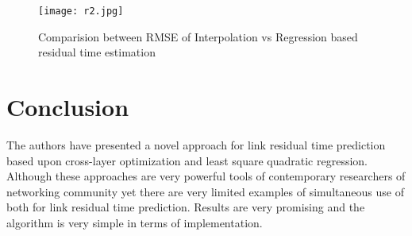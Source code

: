 \documentclass[runningheads]{llncs}
\begin{document}
	
	\begin{center}
		\begin{figure}
			
			\texttt{[image: r2.jpg]}
			\caption{Comparision between RMSE of Interpolation vs Regression based residual time estimation} \label{Fig2}
			
		\end{figure}
	\end{center}
	
	
	
	
	
	
	\section{Conclusion}
	The authors have presented a novel approach for link residual time prediction based upon cross-layer optimization and least square quadratic regression. Although these approaches are very powerful tools of contemporary researchers of networking community yet there are very limited examples of simultaneous use of both for link residual time prediction. Results are very promising and the algorithm is very simple in terms of implementation.
	
	\fi
	
	
	
	
	
\end{document}

